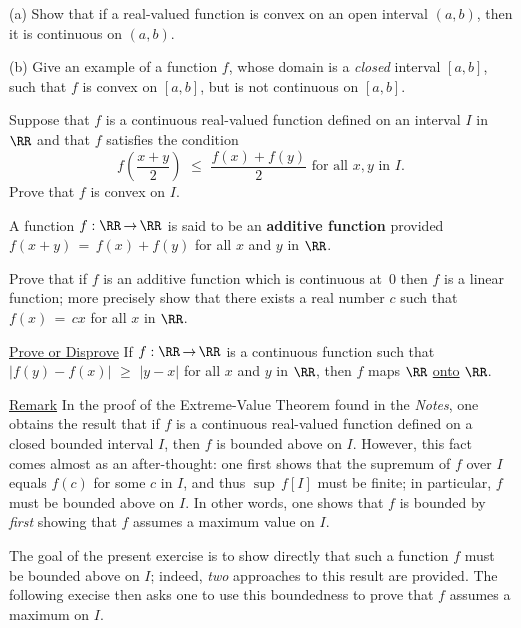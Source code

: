 \V
\V

\noindent \ExDl (a) Show that if a real-valued function is convex on an open interval $(a,b)$, then it is continuous on $(a,b)$.

\V

        (b) Give an example of a function $f$, whose domain is a {\em closed} interval $[a,b]$, such that $f$ is convex on $[a,b]$, but is not continuous on $[a,b]$.

\V
\V

\noindent \ExDm Suppose that $f$ is a continuous real-valued function defined on an interval $I$ in ${\RR}$ and that $f$ satisfies the condition
        \begin{displaymath}
        f\left(\frac{x+y}{2}\right)\,\,{\leq}\,\,\frac{f(x) + f(y)}{2} \mbox{ for all $x,y$ in $I$}.
        \end{displaymath}
    Prove that $f$ is convex on $I$.

\V
\V

\noindent {} A function $f:{\RR} \,{\rightarrow}\, {\RR}$ is said to be an {\bf additive function} provided $f(x+y) \,=\, f(x)+f(y)$ for all $x$ and $y$ in ${\RR}$.

        Prove that if $f$ is an additive function which is continuous at~$0$ then $f$ is a linear function;
    more precisely show that there exists a real number $c$ such that $f(x) \,=\, cx$ for all $x$ in ${\RR}$.

\V
\V

\noindent \ExDo \underline{Prove or Disprove} If $f:{\RR} \,{\rightarrow}\, {\RR}$ is a continuous function such that $|f(y)-f(x)|\,\,{\geq}\,\,|y-x|$ for all $x$ and $y$ in ${\RR}$, then $f$ maps ${\RR}$ \underline{onto} ${\RR}$.

\V
\V

\noindent \ExDp \underline{Remark} In the proof of the Extreme-Value Theorem found in the {\em Notes}, one obtains the result that if $f$ is a continuous real-valued function defined on a closed bounded interval $I$, then $f$ is bounded above on $I$.
    However, this fact comes almost as an after-thought: one first shows that the supremum of $f$ over $I$ equals $f(c)$ for some $c$ in $I$,
    and thus ${\sup}\,f[I]$ must be finite; in particular, $f$ must be bounded above on $I$.
    In other words, one shows that $f$ is bounded by {\em first} showing that $f$ assumes a maximum value on $I$.

        The goal of the present exercise is to show directly that such a function $f$ must be bounded above on $I$;
    indeed, {\em two} approaches to this result are provided.
    The following execise then asks one to use this boundedness to prove that $f$ assumes a maximum on $I$.

